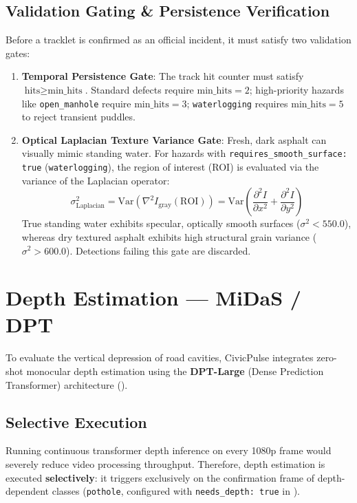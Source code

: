 \documentclass[12pt,a4paper]{article}
\begin{document}
\subsection{Validation Gating \& Persistence Verification}
Before a tracklet is confirmed as an official incident, it must satisfy two validation gates:
\begin{enumerate}[leftmargin=1.8em, itemsep=0.1em]
    \item \textbf{Temporal Persistence Gate}: The track hit counter must satisfy $\text{hits} \ge \text{min\_hits}$. Standard defects require $\text{min\_hits} = 2$; high-priority hazards like \texttt{open\_manhole} require $\text{min\_hits} = 3$; \texttt{waterlogging} requires $\text{min\_hits} = 5$ to reject transient puddles.
    \item \textbf{Optical Laplacian Texture Variance Gate}: Fresh, dark asphalt can visually mimic standing water. For hazards with \texttt{requires\_smooth\_surface: true} (\texttt{waterlogging}), the region of interest (ROI) is evaluated via the variance of the Laplacian operator:
    \begin{equation}
    \sigma^2_{\text{Laplacian}} = \text{Var}\left(\nabla^2 I_{\text{gray}}(\text{ROI})\right) = \text{Var}\left(\frac{\partial^2 I}{\partial x^2} + \frac{\partial^2 I}{\partial y^2}\right)
    \end{equation}
    True standing water exhibits specular, optically smooth surfaces ($\sigma^2 < 550.0$), whereas dry textured asphalt exhibits high structural grain variance ($\sigma^2 > 600.0$). Detections failing this gate are discarded.
\end{enumerate}

\section{Depth Estimation --- MiDaS / DPT}

To evaluate the vertical depression of road cavities, CivicPulse integrates zero-shot monocular depth estimation using the \textbf{DPT-Large} (Dense Prediction Transformer) architecture ().

\subsection{Selective Execution}
Running continuous transformer depth inference on every 1080p frame would severely reduce video processing throughput. Therefore, depth estimation is executed \textbf{selectively}: it triggers exclusively on the confirmation frame of depth-dependent classes (\texttt{pothole}, configured with \texttt{needs\_depth: true} in ).
\end{document}
